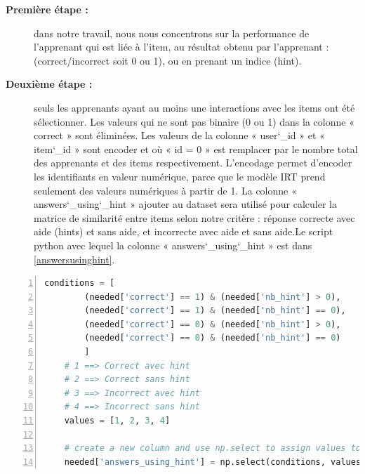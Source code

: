 \begin{description}
    \item[\textbf{Première étape : }] dans notre travail, nous nous concentrons sur la performance de l'apprenant qui est liée à l'item, au résultat obtenu par l'apprenant : (correct/incorrect soit 0 ou 1), ou en prenant un indice (hint).
    \item[\textbf{Deuxième étape : }] seuls les apprenants ayant au moins une interactions avec les items ont été sélectionner. Les valeurs qui ne sont pas binaire (0 ou 1) dans la colonne « correct » sont éliminées. Les valeurs de la colonne « user\char`_id »  et « item\char`_id » sont encoder et où « id = 0 » est remplacer par le nombre total des apprenants et des items respectivement. L’encodage permet d’encoder les identifiants en valeur numérique, parce que le modèle IRT prend seulement des valeurs numériques à partir de 1. La colonne « answers\char`_using\char`_hint » ajouter au dataset sera utilisé pour calculer la matrice de similarité entre items selon notre critère : réponse correcte avec aide (hints) et sans aide, et incorrecte avec aide et sans aide.Le script python avec lequel la colonne « answers\char`_using\char`_hint » est dans \ref{answersusinghint}.
\end{description}

\newpage
\begin{lstlisting}[language=Python,label={answersusinghint}, 
	morekeywords={self},
	keywordstyle=\ttb\color{deepblue},
	emph={MyClass,__init__},
	emphstyle=\ttb\color{deepred},
	stringstyle=\color{deepgreen},basicstyle=\scriptsize, frame=l,framesep=4.5mm,framexleftmargin=2.5mm,tabsize=2,numbers=left,fillcolor=\color{blueforest!70},rulecolor=\color{blueforest},numberstyle=\normalfont\tiny\color{white}]
	conditions = [
		(needed['correct'] == 1) & (needed['nb_hint'] > 0),
		(needed['correct'] == 1) & (needed['nb_hint'] == 0),
		(needed['correct'] == 0) & (needed['nb_hint'] > 0),
		(needed['correct'] == 0) & (needed['nb_hint'] == 0)
		]
	# 1 ==> Correct avec hint
	# 2 ==> Correct sans hint
	# 3 ==> Incorrect avec hint
	# 4 ==> Incorrect sans hint
	values = [1, 2, 3, 4]
	
	# create a new column and use np.select to assign values to it using our lists as arguments
	needed['answers_using_hint'] = np.select(conditions, values)
\end{lstlisting}

